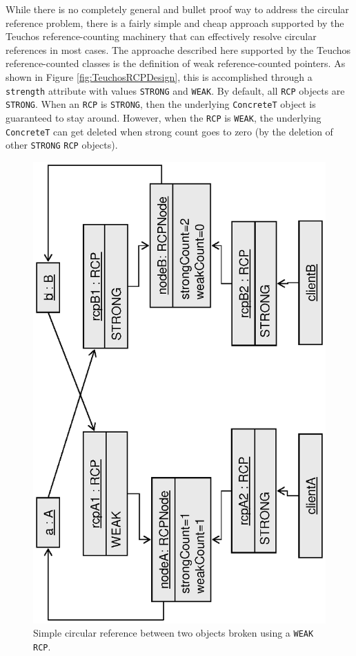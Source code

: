 \documentclass[pdf,ps2pdf,11pt]{SANDreport}
\begin{document}
While there is no completely general and bullet proof way to address
the circular reference problem, there is a fairly simple and cheap
approach supported by the Teuchos reference-counting machinery that
can effectively resolve circular references in most cases.  The
approache described here supported by the Teuchos reference-counted
classes is the definition of weak reference-counted pointers.  As
shown in Figure {}\ref{fig:TeuchosRCPDesign}, this is accomplished
through a {}\texttt{strength} attribute with values {}\texttt{STRONG}
and {}\texttt{WEAK}.  By default, all {}\texttt{RCP} objects are
{}\texttt{STRONG}.  When an {}\texttt{RCP} is {}\texttt{STRONG}, then
the underlying {}\texttt{ConcreteT} object is guaranteed to stay
around.  However, when the {}\texttt{RCP} is {}\texttt{WEAK}, the
underlying {}\texttt{ConcreteT} can get deleted when strong count goes
to zero (by the deletion of other {}\texttt{STRONG} {}\texttt{RCP}
objects).

{\bsinglespace
\begin{figure}
\begin{center}
\includegraphics*[angle=270,scale=0.65]{CircularRCP_A_B_weak}
\end{center}
\caption{
\label{fig:CircularRCP_A_B_weak}
Simple circular reference between two objects broken using a
{}\texttt{WEAK} {}\texttt{RCP}.  }
\end{figure}
\esinglespace}
\end{document}
